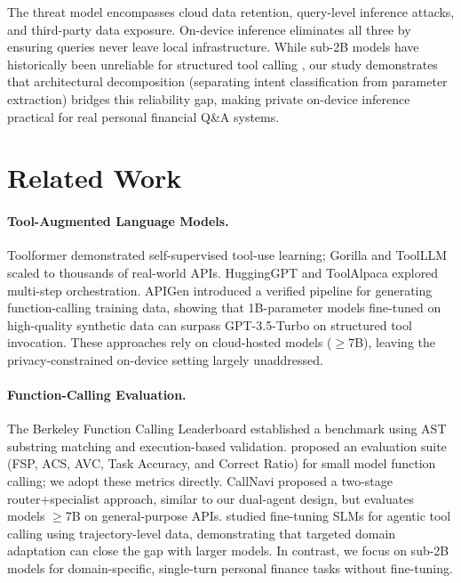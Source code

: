 \documentclass[11pt,twocolumn]{article}
\begin{document}
The threat model encompasses cloud data retention, query-level inference attacks, and third-party data exposure. On-device inference eliminates all three by ensuring queries never leave local infrastructure. While sub-2B models have historically been unreliable for structured tool calling \citep{kavathekar2025small}, our study demonstrates that architectural decomposition (separating intent classification from parameter extraction) bridges this reliability gap, making private on-device inference practical for real personal financial Q\&A systems.

\section{Related Work}

\paragraph{Tool-Augmented Language Models.}
Toolformer \citep{schick2024toolformer} demonstrated self-supervised
tool-use learning; Gorilla \citep{patil2023gorilla} and ToolLLM
\citep{qin2023toolllm} scaled to thousands of real-world APIs.
HuggingGPT \citep{shen2024hugginggpt} and ToolAlpaca
\citep{tang2024toolalpaca} explored multi-step orchestration.
APIGen \citep{liu2024apigen} introduced a verified pipeline for
generating function-calling training data, showing that 1B-parameter
models fine-tuned on high-quality synthetic data can surpass
GPT-3.5-Turbo on structured tool invocation.
These approaches rely on cloud-hosted models ($\ge$7B), leaving the
privacy-constrained on-device setting largely unaddressed.

\paragraph{Function-Calling Evaluation.}
The Berkeley Function Calling Leaderboard \citep{yan2024bfcl}
established a benchmark using AST substring matching and
execution-based validation.
\citet{kavathekar2025small} proposed an evaluation suite (FSP, ACS,
AVC, Task Accuracy, and Correct Ratio) for small model
function calling; we adopt these metrics directly.
CallNavi \citep{callnavi2025} proposed a two-stage
router+specialist approach, similar to our dual-agent
design, but evaluates models $\geq$7B on general-purpose
APIs.
\citet{jhandi2025slafc} studied fine-tuning SLMs for
agentic tool calling using trajectory-level data,
demonstrating that targeted domain adaptation can
close the gap with larger models.
In contrast, we focus on sub-2B models for domain-specific,
single-turn personal finance tasks without fine-tuning.
\end{document}
